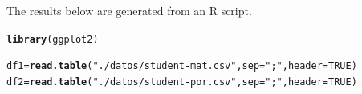 \documentclass{article}\usepackage[]{graphicx}\usepackage[]{xcolor}
\makeatletter
\newcommand{\hlnum}[1]{\textcolor[rgb]{0.686,0.059,0.569}{#1}}%
\newcommand{\hlstr}[1]{\textcolor[rgb]{0.192,0.494,0.8}{#1}}%
\newcommand{\hlstd}[1]{\textcolor[rgb]{0.345,0.345,0.345}{#1}}%
\newcommand{\hlkwb}[1]{\textcolor[rgb]{0.69,0.353,0.396}{#1}}%
\newcommand{\hlkwc}[1]{\textcolor[rgb]{0.333,0.667,0.333}{#1}}%
\newcommand{\hlkwd}[1]{\textcolor[rgb]{0.737,0.353,0.396}{\textbf{#1}}}%
\newenvironment{kframe}{%
 \def\at@end@of@kframe{}%
 \ifinner\ifhmode%
  \def\at@end@of@kframe{\end{minipage}}%
  \begin{minipage}{\columnwidth}%
 \fi\fi%
 \def\FrameCommand##1{\hskip\@totalleftmargin \hskip-\fboxsep
 \colorbox{shadecolor}{##1}\hskip-\fboxsep
     \hskip-\linewidth \hskip-\@totalleftmargin \hskip\columnwidth}%
 \MakeFramed {\advance\hsize-\width
   \@totalleftmargin\z@ \linewidth\hsize
   \@setminipage}}%
 {\par\unskip\endMakeFramed%
 \at@end@of@kframe}
\newenvironment{knitrout}{}{} %
\makeatother
\begin{document}
\title{\title{\title{\title{\title{\title{\title{\title{\title{\title{\title{\title{}}}}}}}}}}}}



\maketitle
The results below are generated from an R script.

\begin{knitrout}
\color{fgcolor}\begin{kframe}
\begin{alltt}
\hlkwd{library}\hlstd{(ggplot2)}

\hlstd{df1}\hlkwb{=}\hlkwd{read.table}\hlstd{(}\hlstr{"./datos/student-mat.csv"}\hlstd{,}\hlkwc{sep}\hlstd{=}\hlstr{";"}\hlstd{,}\hlkwc{header}\hlstd{=}\hlnum{TRUE}\hlstd{)}
\hlstd{df2}\hlkwb{=}\hlkwd{read.table}\hlstd{(}\hlstr{"./datos/student-por.csv"}\hlstd{,}\hlkwc{sep}\hlstd{=}\hlstr{";"}\hlstd{,}\hlkwc{header}\hlstd{=}\hlnum{TRUE}\hlstd{)}


\end{alltt}
\end{kframe}
\end{knitrout}
\end{document}
